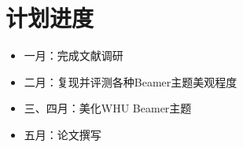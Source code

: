 \section{计划进度}
\begin{frame}
    \begin{itemize}
        \item 一月：完成文献调研
        \item 二月：复现并评测各种Beamer主题美观程度
        \item 三、四月：美化WHU Beamer主题
        \item 五月：论文撰写
    \end{itemize}
\end{frame}